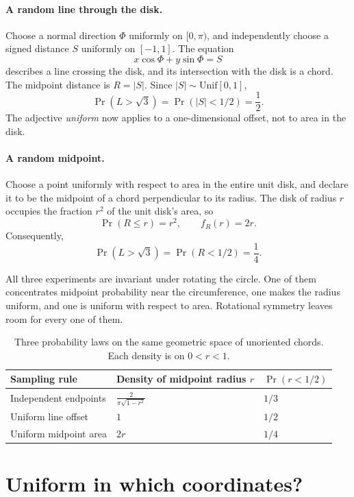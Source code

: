 \paragraph{A random line through the disk.}
Choose a normal direction \(\Phi\) uniformly on \([0,\pi)\), and independently choose a signed distance \(S\) uniformly on \([-1,1]\). The equation
\[
 x\cos\Phi+y\sin\Phi=S
\]
describes a line crossing the disk, and its intersection with the disk is a chord. The midpoint distance is \(R=|S|\). Since \(|S|\sim\mathrm{Unif}[0,1]\),
\[
 \boxed{\Pr(L>\sqrt3)=\Pr(|S|<1/2)=\frac12.}
\]
The adjective \emph{uniform} now applies to a one-dimensional offset, not to area in the disk.

\paragraph{A random midpoint.}
Choose a point uniformly with respect to area in the entire unit disk, and declare it to be the midpoint of a chord perpendicular to its radius. The disk of radius \(r\) occupies the fraction \(r^2\) of the unit disk's area, so
\[
 \Pr(R\leq r)=r^2,\qquad f_R(r)=2r.
\]
Consequently,
\[
 \boxed{\Pr(L>\sqrt3)=\Pr(R<1/2)=\frac14.}
\]

All three experiments are invariant under rotating the circle. One of them concentrates midpoint probability near the circumference, one makes the radius uniform, and one is uniform with respect to area. Rotational symmetry leaves room for every one of them.

\begin{table}[htbp]
\centering
\renewcommand{\arraystretch}{1.25}
\begin{tabular}{@{}lll@{}}
\toprule
Sampling rule & Density of midpoint radius \(r\) & \(\Pr(r<1/2)\)\\
\midrule
Independent endpoints & \(\displaystyle \frac{2}{\pi\sqrt{1-r^2}}\) & \(1/3\)\\
Uniform line offset & \(1\) & \(1/2\)\\
Uniform midpoint area & \(2r\) & \(1/4\)\\
\bottomrule
\end{tabular}
\caption{Three probability laws on the same geometric space of unoriented chords. Each density is on \(0<r<1\).}
\label{tab:N20261105-chord-laws}
\end{table}

\section{Uniform in which coordinates?}

